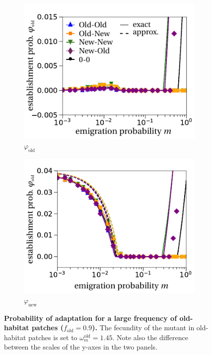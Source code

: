 \documentclass[11pt]{article}
\begin{document}
\begin{figure}[h!]
	\centering
	\begin{subfigure}{.5\textwidth}
		\centering
		\includegraphics[width=\linewidth]{figS5a.pdf}
		\caption{$\varphi_{\text{old}}$}
	\end{subfigure}%
	\begin{subfigure}{.5\textwidth}
		\centering
		\includegraphics[width=\linewidth]{figS5b.pdf}
		\caption{$\varphi_{\text{new}}$}
	\end{subfigure}
	\caption{\textbf{Probability of adaptation for a large frequency of old-habitat patches ($f_{\text{old}}=0.9$).} The fecundity of the mutant in old-habitat patches is set to $\omega^\text{old}_m=1.45$. Note also the difference between the scales of the y-axes in the two panels.}
	\label{Sfig:vary_f}
\end{figure}
\end{document}
